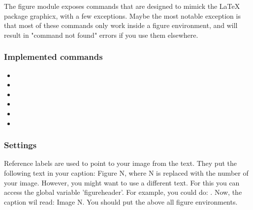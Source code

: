\begin{paragraph}
    The figure module exposes commands that are designed to mimick the LaTeX package graphicx, with a few exceptions. 
    Maybe the most notable exception is that most of these commands only work inside a figure environment, and will result in "command not found" errors if you use them elsewhere.
\end{paragraph}

\subsubsection{Implemented commands}
\begin{itemize}
    \item{}
    \item{}
    \item{}
    \item{}
    \item{}
    \item{}
\end{itemize}

\subsubsection{Settings}
\begin{paragraph}
    Reference labels are used to point to your image from the text. They put the following text in your caption: Figure N, where N is replaced with the number of your image. However, you might want to use a different text. For this you can access the global variable 'figureheader'. For example, you could do: . Now, the caption wil read: Image N. You should put the  above all figure environments.
\end{paragraph}

